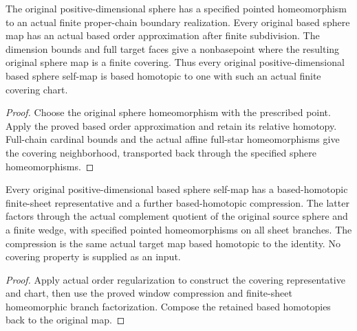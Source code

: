 \begin{proposition}
  \label{prop:actual-sphere-order-regularization}
  \leanok
  The original positive-dimensional sphere has a specified pointed homeomorphism to an actual finite proper-chain boundary realization. Every original based sphere map has an actual based order approximation after finite subdivision. The dimension bounds and full target faces give a nonbasepoint where the resulting original sphere map is a finite covering. Thus every original positive-dimensional based sphere self-map is based homotopic to one with such an actual finite covering chart.
\end{proposition}
\begin{proof}
  Choose the original sphere homeomorphism with the prescribed point. Apply the proved based order approximation and retain its relative homotopy. Full-chain cardinal bounds and the actual affine full-star homeomorphisms give the covering neighborhood, transported back through the specified sphere homeomorphisms.
  \leanok
\end{proof}

\begin{proposition}
  \label{prop:actual-sphere-finite-collapse-decomposition}
  \leanok
  Every original positive-dimensional based sphere self-map has a based-homotopic finite-sheet representative and a further based-homotopic compression. The latter factors through the actual complement quotient of the original source sphere and a finite wedge, with specified pointed homeomorphisms on all sheet branches. The compression is the same actual target map based homotopic to the identity. No covering property is supplied as an input.
\end{proposition}
\begin{proof}
  Apply actual order regularization to construct the covering representative and chart, then use the proved window compression and finite-sheet homeomorphic branch factorization. Compose the retained based homotopies back to the original map.
  \leanok
\end{proof}

